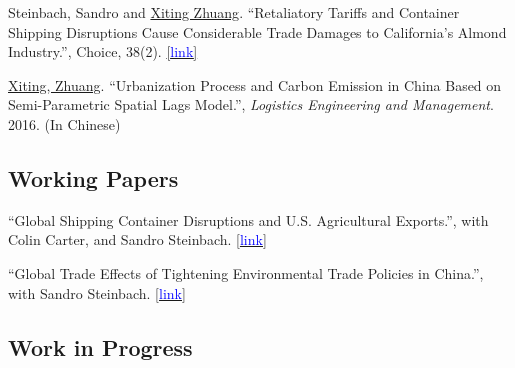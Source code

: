 \documentclass[11 pt,letterpaper]{article}
\renewenvironment{itemize}{
	\begin{list}{}{
			\setlength{\leftmargin}{1.5em}
		}
	}{
	\end{list}
}
\begin{document}
\begin{itemize}
	
	
	\item[-] Steinbach, Sandro and  \underline{Xiting Zhuang}. ``Retaliatory Tariffs and Container Shipping Disruptions Cause Considerable Trade Damages to California’s Almond Industry.'', Choice, 38(2).  	\href{https://econpapers.repec.org/scripts/redir.pf?u=https%3A%2F%2Fageconsearch.umn.edu%2Frecord%2F337188%2Ffiles%2FSteinbach_Retaliatory_38.pdf;h=repec:ags:aaeach:337188}{[{\underline{\textcolor{blue}{link}}}]}
		 	
		 \item[-]	\underline{Xiting, Zhuang}. ``Urbanization Process and Carbon Emission in China Based on Semi-Parametric Spatial Lags Model.'',   \textit{Logistics Engineering and Management}. 2016.  (In Chinese)
 

 	
 
		\end{itemize}
	
 
		
		
		
		
	\subsection*{\textbf{Working Papers}}
	
	\begin{itemize}
	

	  	 \item[-]	``Global Shipping Container Disruptions and U.S. Agricultural Exports.'',  with Colin Carter, and Sandro Steinbach. 
	  	\href{http://dx.doi.org/10.22004/ag.econ.320397}{[{\underline{\textcolor{blue}{link}}}]}
	
	
 
 

 
	
 		
	 \item[-] ``Global Trade Effects of Tightening Environmental Trade Policies in China.'', with Sandro Steinbach. 
\href{https://www.dropbox.com/scl/fi/21o4ldsv04zo4w7bs6y5w/Manuscript.pdf?rlkey=phzrh7uhti8zm0wxpn786gu94&dl=0}{[{\underline{\textcolor{blue}{link}}}]}

 

	\end{itemize}
	
 
 \subsection*{\textbf{ Work in Progress}}
 
\end{document}
